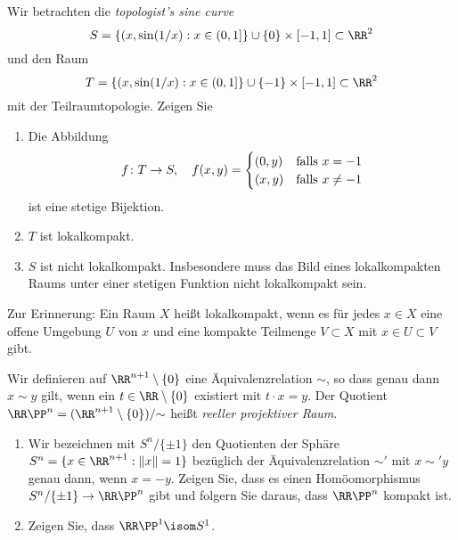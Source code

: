 

\setcounter{Sheet}{5}



\maketitle
\begin{exercise}
Wir betrachten die \emph{topologist's sine curve}
\[
S = \{(x,\sin(1/x) : x\in (0,1]\}\cup \{0\}\times[-1,1] \subset \RR^2
\]
und den Raum
\[
T = \{(x,\sin(1/x) : x\in (0,1]\}\cup \{-1\}\times[-1,1] \subset \RR^2
\]
mit der Teilraumtopologie. Zeigen Sie
\begin{enumerate}
\item Die Abbildung
\[
f\colon T \to S,\quad f(x,y) = \begin{cases}
(0,y) & \textnormal{falls $x=-1$} \\
(x,y) & \textnormal{falls $x\neq -1$}
\end{cases}
\]
ist eine stetige Bijektion.
\item $T$ ist lokalkompakt.
\item $S$ ist nicht lokalkompakt. {\footnotesize Insbesondere muss das Bild eines lokalkompakten Raums unter einer stetigen Funktion nicht lokalkompakt sein.}
\end{enumerate}
{\footnotesize Zur Erinnerung: Ein Raum $X$ heißt lokalkompakt, wenn es für jedes $x\in X$ eine offene Umgebung $U$ von $x$ und eine kompakte Teilmenge $V\subset X$ mit $x\in U\subset V$ gibt.}
\end{exercise}

\begin{exercise}
Wir definieren auf $\RR^{n+1}\setminus\{0\}$ eine Äquivalenzrelation ${\sim}$, so dass genau dann $x\sim y$ gilt, wenn ein $t\in\RR\setminus\{0\}$ existiert mit $t\cdot x = y$. Der Quotient $\RR\PP^n = (\RR^{n+1}\setminus\{0\})/{\sim}$ heißt \emph{reeller projektiver Raum}.
\begin{enumerate}
\item Wir bezeichnen mit $S^n/\{\pm 1\}$ den Quotienten der Sphäre $S^n = \{x\in \RR^{n+1} : \|x\| =1\}$ bezüglich der Äquivalenzrelation $\sim'$ mit $x\sim' y$ genau dann, wenn $x = -y$. Zeigen Sie, dass es einen Homöomorphismus $S^n/\{\pm 1\} \to \RR\PP^{n}$ gibt und folgern Sie daraus, dass $\RR\PP^n$ kompakt ist.
\item Zeigen Sie, dass $\RR\PP^{1} \isom S^1$.
\end{enumerate}
\end{exercise}

